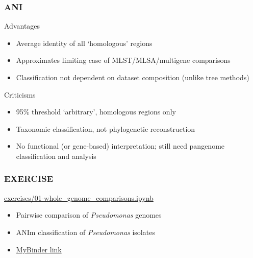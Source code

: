 \begin{frame}
  \frametitle{ANI}
  \begin{alertblock}{Advantages}
    \begin{itemize}
      \item Average identity of all `homologous' regions
      \item Approximates limiting case of MLST/MLSA/multigene comparisons
      \item Classification not dependent on dataset composition (unlike tree methods)
    \end{itemize}    
  \end{alertblock}
  \begin{block}{Criticisms}
    \begin{itemize}
      \item 95\% threshold `arbitrary', homologous regions only
      \item Taxonomic classification, not phylogenetic reconstruction
      \item No functional (or gene-based) interpretation; still need pangenome classification and analysis
    \end{itemize}
  \end{block}
\end{frame}

\begin{frame}
  \frametitle{EXERCISE}
  \begin{alertblock}{\url{exercises/01-whole_genome_comparisons.ipynb}}
    \begin{itemize}
      \item Pairwise comparison of \textit{Pseudomonas} genomes
      \item ANIm classification of \textit{Pseudomonas} isolates
    \end{itemize}
  \end{alertblock}
  \begin{itemize}
    \item \textcolor{hutton_purple}{\href{http://mybinder.org/repo/widdowquinn/Teaching-EMBL-Plant-Path-Genomics}{MyBinder link}}
  \end{itemize}
\end{frame}